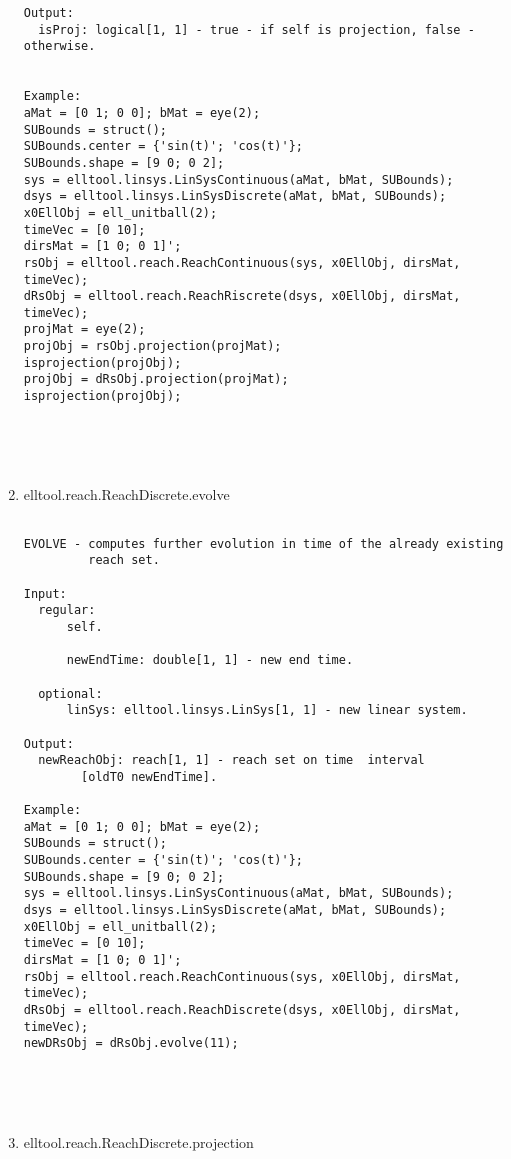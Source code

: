 \begin{enumerate}
\begin{lstlisting}
Output:
  isProj: logical[1, 1] - true - if self is projection, false - otherwise.


Example:
aMat = [0 1; 0 0]; bMat = eye(2);
SUBounds = struct();
SUBounds.center = {'sin(t)'; 'cos(t)'};
SUBounds.shape = [9 0; 0 2];
sys = elltool.linsys.LinSysContinuous(aMat, bMat, SUBounds);
dsys = elltool.linsys.LinSysDiscrete(aMat, bMat, SUBounds);
x0EllObj = ell_unitball(2);
timeVec = [0 10];
dirsMat = [1 0; 0 1]';
rsObj = elltool.reach.ReachContinuous(sys, x0EllObj, dirsMat, timeVec);
dRsObj = elltool.reach.ReachRiscrete(dsys, x0EllObj, dirsMat, timeVec);
projMat = eye(2);
projObj = rsObj.projection(projMat);
isprojection(projObj);
projObj = dRsObj.projection(projMat);
isprojection(projObj);





\end{lstlisting}
\fontfamily{\familydefault}
\selectfont
\item {elltool.reach.ReachDiscrete.evolve}
\selectfont
\begin{lstlisting}

EVOLVE - computes further evolution in time of the already existing
         reach set.

Input:
  regular:
      self.

      newEndTime: double[1, 1] - new end time.

  optional:
      linSys: elltool.linsys.LinSys[1, 1] - new linear system.

Output:
  newReachObj: reach[1, 1] - reach set on time  interval
        [oldT0 newEndTime].

Example:
aMat = [0 1; 0 0]; bMat = eye(2);
SUBounds = struct();
SUBounds.center = {'sin(t)'; 'cos(t)'};
SUBounds.shape = [9 0; 0 2];
sys = elltool.linsys.LinSysContinuous(aMat, bMat, SUBounds);
dsys = elltool.linsys.LinSysDiscrete(aMat, bMat, SUBounds);
x0EllObj = ell_unitball(2);
timeVec = [0 10];
dirsMat = [1 0; 0 1]';
rsObj = elltool.reach.ReachContinuous(sys, x0EllObj, dirsMat, timeVec);
dRsObj = elltool.reach.ReachDiscrete(dsys, x0EllObj, dirsMat, timeVec);
newDRsObj = dRsObj.evolve(11);





\end{lstlisting}
\fontfamily{\familydefault}
\selectfont
\item {elltool.reach.ReachDiscrete.projection}
\selectfont
\begin{lstlisting}


\end{lstlisting}
\end{enumerate}

